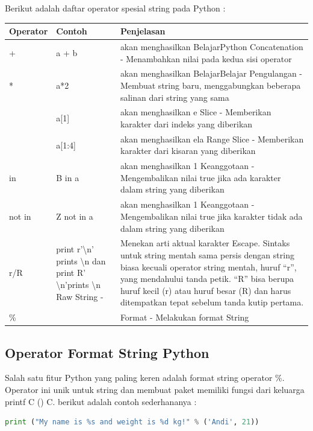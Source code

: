Berikut adalah daftar operator spesial string pada Python :
\begin{center}
\begin{tabular}{ | m{2cm} | m{2cm} | m{5cm} | }
\hline
Operator & Contoh & Penjelasan \\
\hline
+ & a + b & akan menghasilkan BelajarPython Concatenation - Menambahkan nilai pada kedua sisi operator\\
\hline
* & a*2 & akan menghasilkan BelajarBelajar Pengulangan - Membuat string baru, menggabungkan beberapa salinan dari string yang sama\\
\hline
[] & a[1] & akan menghasilkan e Slice - Memberikan karakter dari indeks yang diberikan\\
\hline
[ : ] & a[1:4] & akan menghasilkan ela Range Slice - Memberikan karakter dari kisaran yang diberikan\\
\hline
in & B in a & akan menghasilkan 1 Keanggotaan - Mengembalikan nilai true jika ada karakter dalam string yang diberikan\\
\hline
not in & Z not in a & akan menghasilkan 1 Keanggotaan - Mengembalikan nilai true jika karakter tidak ada dalam string yang diberikan\\
\hline
r/R & print r’\textbackslash n’ prints \textbackslash n dan print R’ \textbackslash n’prints \textbackslash n Raw String - & Menekan arti aktual karakter Escape. Sintaks untuk string mentah sama persis dengan string biasa kecuali operator string mentah, huruf “r”, yang mendahului tanda petik. “R” bisa berupa huruf kecil (r) atau huruf besar (R) dan harus ditempatkan tepat sebelum tanda kutip pertama.\\
\hline
\% & & Format - Melakukan format String\\
\hline
\end{tabular}
\end{center}

\subsection{Operator Format String Python}
Salah satu fitur Python yang paling keren adalah format string operator \%. Operator ini unik untuk string dan membuat paket memiliki fungsi dari keluarga printf C () C. berikut adalah contoh sederhananya :
\begin{lstlisting}[language=Python]
print ("My name is %s and weight is %d kg!" % ('Andi', 21))
\end{lstlisting}

